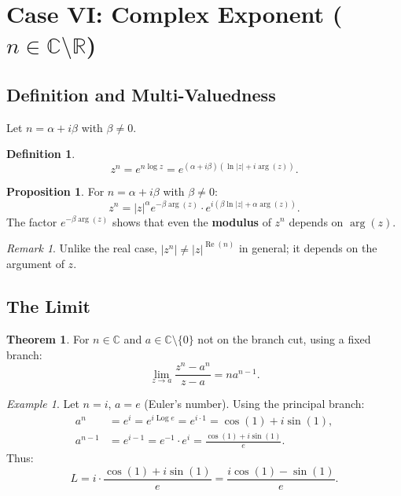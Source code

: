 \documentclass{article}
\theoremstyle{definition}
\newtheorem{definition}{Definition}[section]
\newtheorem{theorem}{Theorem}[section]
\newtheorem{proposition}{Proposition}[section]
\theoremstyle{remark}
\newtheorem{remark}{Remark}[section]
\newtheorem{example}{Example}[section]
\newcommand{\C}{\mathbb{C}}
\newcommand{\R}{\mathbb{R}}
\newcommand{\Log}{\operatorname{Log}}
\newcommand{\re}{\operatorname{Re}}
\begin{document}
\section{Case VI: Complex Exponent ($n \in \C \setminus \R$)}

\subsection{Definition and Multi-Valuedness}

Let $n = \alpha + i\beta$ with $\beta \neq 0$.

\begin{definition}
\begin{equation}
z^n = e^{n \log z} = e^{(\alpha + i\beta)(\ln|z| + i\arg(z))}.
\end{equation}
\end{definition}

\begin{proposition}
For $n = \alpha + i\beta$ with $\beta \neq 0$:
\begin{equation}
z^n = |z|^\alpha e^{-\beta \arg(z)} \cdot e^{i(\beta \ln|z| + \alpha \arg(z))}.
\end{equation}
The factor $e^{-\beta \arg(z)}$ shows that even the \textbf{modulus} of $z^n$ depends on $\arg(z)$.
\end{proposition}

\begin{remark}
Unlike the real case, $|z^n| \neq |z|^{\re(n)}$ in general; it depends on the argument of $z$.
\end{remark}

\subsection{The Limit}

\begin{theorem}
For $n \in \C$ and $a \in \C \setminus \{0\}$ not on the branch cut, using a fixed branch:
\begin{equation}
\lim_{z \to a} \frac{z^n - a^n}{z - a} = n a^{n-1}.
\end{equation}
\end{theorem}

\begin{example}
Let $n = i$, $a = e$ (Euler's number). Using the principal branch:
\begin{align}
a^n &= e^i = e^{i \Log e} = e^{i \cdot 1} = \cos(1) + i\sin(1), \\
a^{n-1} &= e^{i-1} = e^{-1} \cdot e^i = \frac{\cos(1) + i\sin(1)}{e}.
\end{align}
Thus:
\begin{equation}
L = i \cdot \frac{\cos(1) + i\sin(1)}{e} = \frac{i\cos(1) - \sin(1)}{e}.
\end{equation}
\end{example}
\end{document}
